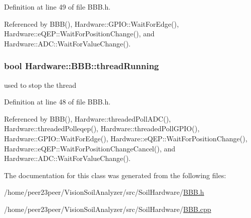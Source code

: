 Definition at line 49 of file B\+B\+B.\+h.



Referenced by B\+B\+B(), Hardware\+::\+G\+P\+I\+O\+::\+Wait\+For\+Edge(), Hardware\+::e\+Q\+E\+P\+::\+Wait\+For\+Position\+Change(), and Hardware\+::\+A\+D\+C\+::\+Wait\+For\+Value\+Change().

\hypertarget{class_hardware_1_1_b_b_b_a0d9d8c56afb37955e0d0c6baf0f418df}{}
\subsubsection[{thread\+Running}]{\setlength{\rightskip}{0pt plus 5cm}bool Hardware\+::\+B\+B\+B\+::thread\+Running\hspace{0.3cm}{\ttfamily [protected]}}\label{class_hardware_1_1_b_b_b_a0d9d8c56afb37955e0d0c6baf0f418df}
used to stop the thread 

Definition at line 48 of file B\+B\+B.\+h.



Referenced by B\+B\+B(), Hardware\+::threaded\+Poll\+A\+D\+C(), Hardware\+::threaded\+Polleqep(), Hardware\+::threaded\+Poll\+G\+P\+I\+O(), Hardware\+::\+G\+P\+I\+O\+::\+Wait\+For\+Edge(), Hardware\+::e\+Q\+E\+P\+::\+Wait\+For\+Position\+Change(), Hardware\+::e\+Q\+E\+P\+::\+Wait\+For\+Position\+Change\+Cancel(), and Hardware\+::\+A\+D\+C\+::\+Wait\+For\+Value\+Change().



The documentation for this class was generated from the following files\+:\begin{DoxyCompactItemize}
\item 
/home/peer23peer/\+Vision\+Soil\+Analyzer/src/\+Soil\+Hardware/\hyperlink{_b_b_b_8h}{B\+B\+B.\+h}\item 
/home/peer23peer/\+Vision\+Soil\+Analyzer/src/\+Soil\+Hardware/\hyperlink{_b_b_b_8cpp}{B\+B\+B.\+cpp}\end{DoxyCompactItemize}
